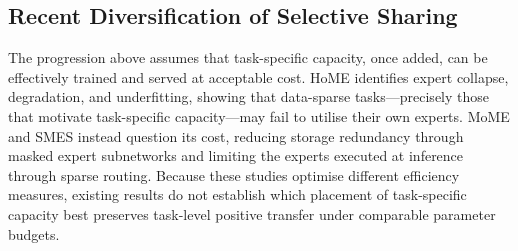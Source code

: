 \subsection{Recent Diversification of Selective Sharing}
The progression above assumes that task-specific capacity, once added, can be effectively trained and served at acceptable cost.
HoME \citep{wang2025home} identifies expert collapse, degradation, and underfitting,
showing that data-sparse tasks—precisely those that motivate task-specific capacity—may
fail to utilise their own experts. MoME \citep{Xu2024MoME} and SMES \citep{Zhang2026SMES}
instead question its cost, reducing storage redundancy through masked expert
subnetworks and limiting the experts executed at inference through sparse routing.
Because these studies optimise different efficiency measures, existing results do not
establish which placement of task-specific capacity best preserves task-level positive
transfer under comparable parameter budgets.




